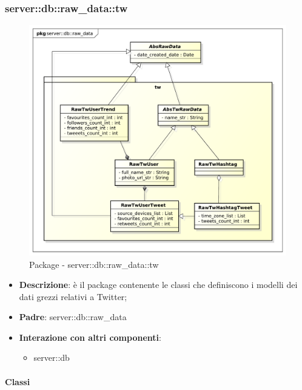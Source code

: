 		\subsubsection{server::db::raw\_data::tw} %
		\label{ssub:bdsm_app_server_db_raw_data_tw}
		\begin{figure}[htbp]
			\centering
			\centerline{\includegraphics[scale=0.45]{./images/server/raw_data_tw.pdf}}
			\caption{Package - server::db::raw\_data::tw}
		\end{figure}

		\begin{itemize}
		  \item \textbf{Descrizione}: è il package contenente le classi che definiscono i modelli dei dati grezzi relativi a Twitter;
		  \item \textbf{Padre}: server::db::raw\_data
		  \item \textbf{Interazione con altri componenti}:
		  	\begin{itemize}
		  		\item server::db
			\end{itemize}
		\end{itemize}

		\paragraph{Classi} %


